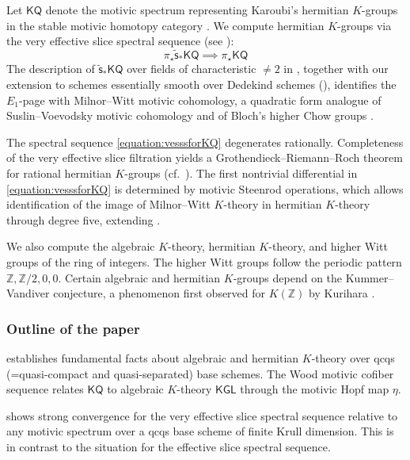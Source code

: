 \documentclass[11pt,hyp,english]{article}
\newcommand{\Z}{\mathbb{Z}}
\newcommand{\KGL}{\mathsf{KGL}}
\newcommand{\KQ}{\mathsf{KQ}}
\newcommand{\vs}{\tilde{\mathsf{s}}}
\theoremstyle{definition}
\begin{document}
\vspace{0.1in}

Let $\KQ$ denote the motivic spectrum representing Karoubi’s hermitian $K$-groups in the stable motivic homotopy category \cite{chn,hornbostel}. We compute hermitian $K$-groups via the very effective slice spectral sequence \cite{SO:twisted} (see ):
\begin{equation}
\label{equation:vesssforKQ}
\pi_{\star}\vs_{\ast}\KQ \implies \pi_{\star}\KQ 
\end{equation}
The description of $\vs_{\ast}\KQ$ over fields of characteristic $\neq 2$ in \cite[Theorem 16]{Bachmann}, together with our extension to schemes essentially smooth over Dedekind schemes (), identifies the $E_{1}$-page with Milnor–Witt motivic cohomology, a quadratic form analogue of Suslin–Voevodsky motivic cohomology and of Bloch’s higher Chow groups \cite{2020arXiv200406634B}.

The spectral sequence \eqref{equation:vesssforKQ} degenerates rationally. Completeness of the very effective slice filtration yields a Grothendieck–Riemann–Roch theorem for rational hermitian $K$-groups (cf.~\cite{Borel-iso}). The first nontrivial differential in \eqref{equation:vesssforKQ} is determined by motivic Steenrod operations, which allows identification of the image of Milnor–Witt $K$-theory in hermitian $K$-theory through degree five, extending \cite{KO-map}.

We also compute the algebraic $K$-theory, hermitian $K$-theory, and higher Witt groups of the ring of integers. The higher Witt groups follow the periodic pattern $\Z,\Z/2,0,0$. Certain algebraic and hermitian $K$-groups depend on the Kummer–Vandiver conjecture, a phenomenon first observed for $K(\Z)$ by Kurihara \cite{zbMATH00034713}.





\subsubsection*{Outline of the paper}

 establishes fundamental facts about algebraic and hermitian $K$-theory 
over qcqs (=quasi-compact and quasi-separated) base schemes.
The Wood motivic cofiber sequence relates $\KQ$ to algebraic $K$-theory $\KGL$ 
through the motivic Hopf map $\eta$.
\vspace{0.1in}

 shows strong convergence for the very effective slice spectral 
sequence relative to any motivic spectrum over a qcqs base scheme of finite Krull dimension.
This is in contrast to the situation for the effective slice spectral sequence.
\vspace{0.1in}
\end{document}
